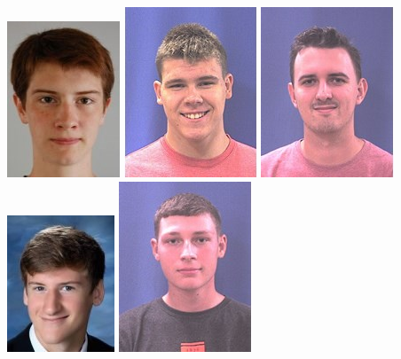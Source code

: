 \documentclass[xcolor={usenames,dvipsnames,svgnames,table},12pt]{beamer}
\begin{document}
\begin{frame}{}
\begin{center}
\includegraphics[width=\photosize]{S21/000573019.jpg}
\includegraphics[width=\photosize]{S21/000565231.jpg}
\includegraphics[width=\photosize]{S21/000568832.jpg}
\includegraphics[width=\photosize]{S21/000572633.jpg}
\includegraphics[width=\photosize]{S21/000569064.jpg}

\end{center}
\end{frame}
\end{document}
